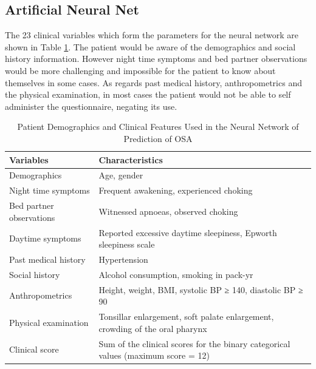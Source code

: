 \subsection{Artificial Neural Net}
The 23 clinical variables which form the parameters for the neural network are shown in Table \ref{table:neural}. The patient would be aware of the demographics and social history information. However night time symptoms and bed partner observations would be more challenging and impossible for the patient to know about themselves in some cases. As regards past medical history, anthropometrics and the physical examination, in most cases the patient would not be able to self administer the questionnaire, negating its use.
\begin{table}[h]
\centering
\begin{tabular}{l l}
\toprule
Variables&Characteristics\\ \midrule
Demographics&Age, gender\\ 
Night time symptoms&Frequent awakening, experienced choking\\ 
Bed partner observations&Witnessed apnoeas, observed choking\\ 
Daytime symptoms&Reported excessive daytime sleepiness, Epworth sleepiness scale\\ 
Past medical history&Hypertension\\ 
Social history&Alcohol consumption, smoking in pack-yr\\ 
Anthropometrics&Height, weight, BMI, systolic BP ≥ 140, diastolic BP ≥ 90\\ 
Physical examination&Tonsillar enlargement, soft palate enlargement, crowding of the oral pharynx\\ 
Clinical score&Sum of the clinical scores for the binary categorical values (maximum score = 12)\\ \bottomrule
\end{tabular}
\caption{Patient Demographics and Clinical Features Used in the Neural Network of Prediction of OSA}
\label{table:neural}
\end{table} 

